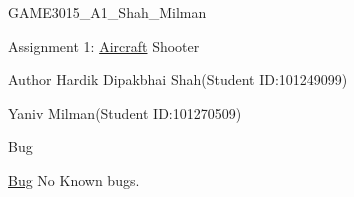 GAME3015\+\_\+\+A1\+\_\+\+Shah\+\_\+\+Milman

Assignment 1\+: \mbox{\hyperlink{class_aircraft}{Aircraft}} Shooter

\begin{DoxyAuthor}{Author}
Hardik Dipakbhai Shah(\+Student ID\+:101249099) 

Yaniv Milman(\+Student ID\+:101270509)
\end{DoxyAuthor}
\begin{DoxyRefDesc}{Bug}
\item[\mbox{\hyperlink{bug__bug000001}{Bug}}]No Known bugs. \end{DoxyRefDesc}
